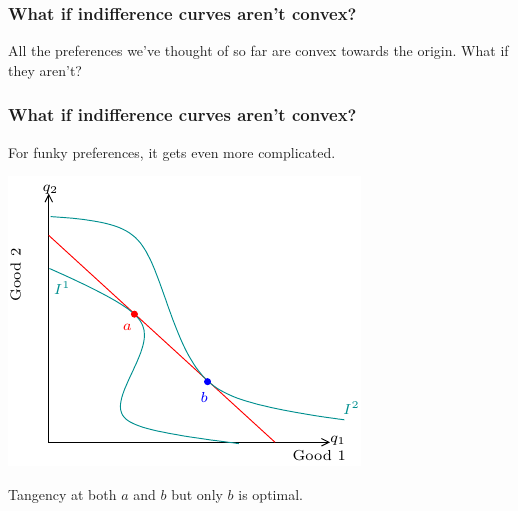 \documentclass[xcolor=pdftex,dvipsnames]{beamer}
\begin{document}
\begin{frame}
\frametitle{What if indifference curves aren't convex?}

All the preferences we've thought of so far are convex towards the
origin. What if they aren't? 

\end{frame}

\begin{frame}
\frametitle{What if indifference curves aren't convex?}
For funky preferences, it gets even more complicated.
\begin{center}
\includegraphics{pics/FunkyMax}
\end{center}
Tangency at both $a$ and $b$ but only $b$ is optimal.
\end{frame}
\end{document}
